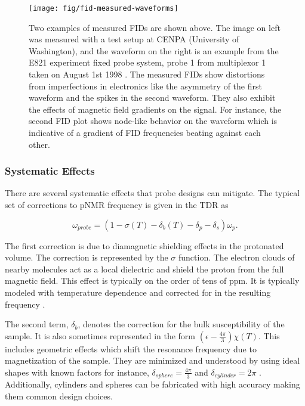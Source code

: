 \begin{figure}
\label{fig:fid-measured-waveforms}
\centering
\texttt{[image: fig/fid-measured-waveforms]}
\caption{
    Two examples of measured FIDs are shown above. The image on left was measured with a test setup at CENPA (University of Washington), and the waveform on the right is an example from the E821 experiment fixed probe system, probe 1 from multiplexor 1 taken on August 1st 1998 \cite{jungmann-priv}.  The measured FIDs show distortions from imperfections in electronics like the asymmetry of the first waveform and the spikes in the second waveform.  They also exhibit the effects of magnetic field gradients on the signal.  For instance, the second FID plot shows node-like behavior on the waveform which is indicative of a gradient of FID frequencies beating against each other.
}
\end{figure}

\subsubsection{Systematic Effects}

There are several systematic effects that probe designs can mitigate. 
The typical set of corrections to pNMR frequency is given in the \mugmtwo TDR \cite{e989-tdr} as

\begin{equation}
\label{eqn:nmr-effects-model}
\omega_{probe} = (1 - \sigma(T) - \delta_b(T) - \delta_p - \delta_s) \omega_p.
\end{equation}

The first correction is due to diamagnetic shielding effects in the protonated volume.  The correction is represented by the $\sigma$ function.  The electron clouds of nearby molecules act as a local dielectric and shield the proton from the full magnetic field.  This effect is typically on the order of tens of ppm.  It is typically modeled with temperature dependence and corrected for in the resulting frequency \cite{schenk-med-nmr}.

The second term, $\delta_b$, denotes the correction for the bulk susceptibility of the sample.  It is also sometimes represented in the form $\left(\epsilon - \frac{4\pi}{3}\right) \chi(T)$.  This includes geometric effects which shift the resonance frequency due to magnetization of the sample.  They are minimized and understood by using ideal shapes with known factors for instance, $\delta_{sphere} = \frac{4\pi}{3}$ and $\delta_{cylinder} = 2\pi$ \cite{e989-tdr}.  Additionally, cylinders and spheres can be fabricated with high accuracy making them common design choices.

